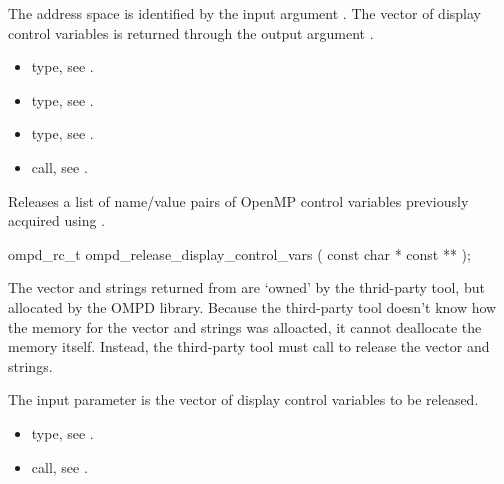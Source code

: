 \argdesc
The address space is identified by the input argument .
The vector of display control variables is returned through
the output argument .

\crossreferences
\begin{itemize}
  \item {} type, see .
	\item {} type, see .
	\item {} type, see .
	\item {} call, see .
\end{itemize}


\label{subsubsubsec:ompd_release_display_control_vars}
\summary

Releases a list of name/value pairs of OpenMP control variables
previously acquired using .
\format
\begin{cspecific}
\begin{ompSyntax}
ompd_rc_t ompd_release_display_control_vars (
  const char * const **
);
\end{ompSyntax}
\end{cspecific}

\descr
The vector and strings returned from 
are `owned' by the thrid-party tool, but allocated by the OMPD library.
Because the third-party tool doesn't know how the memory for the vector
and strings was alloacted, it cannot deallocate the memory itself.
Instead, the third-party tool must call
 to release the vector
and strings.

\argdesc
The input parameter  is the vector of display control variables to be released.

\crossreferences
\begin{itemize}
  \item {} type, see .
	\item {} call, see .
\end{itemize}


